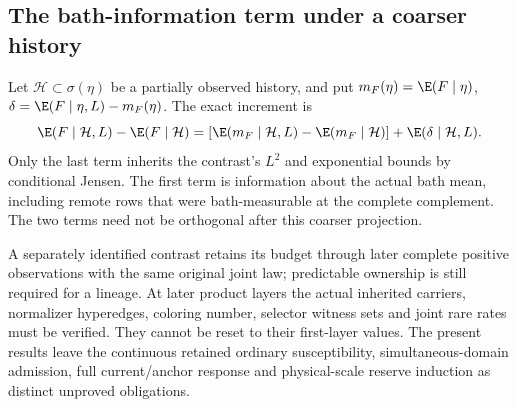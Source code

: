 \subsection{The bath-information term under a coarser history}

Let \(\mathcal H\subset\sigma(\eta)\) be a partially observed history, and put \(m_F(\eta)=\E(F\mid\eta)\), \(\delta=\E(F\mid\eta,L)-m_F(\eta)\). The exact increment is
\begin{equation}
 \E(F\mid\mathcal H,L)-\E(F\mid\mathcal H)
 =
 \left[\E(m_F\mid\mathcal H,L)-\E(m_F\mid\mathcal H)\right]
       +\E(\delta\mid\mathcal H,L).
 \label{sel:coarsehistory}
\end{equation}
Only the last term inherits the contrast's \(L^2\) and exponential bounds by conditional Jensen. The first term is information about the actual bath mean, including remote rows that were bath-measurable at the complete complement. The two terms need not be orthogonal after this coarser projection.

A separately identified contrast retains its budget through later complete positive observations with the same original joint law; predictable ownership is still required for a lineage. At later product layers the actual inherited carriers, normalizer hyperedges, coloring number, selector witness sets and joint rare rates must be verified. They cannot be reset to their first-layer values. The present results leave the continuous retained ordinary susceptibility, simultaneous-domain admission, full current/anchor response and physical-scale reserve induction as distinct unproved obligations.
